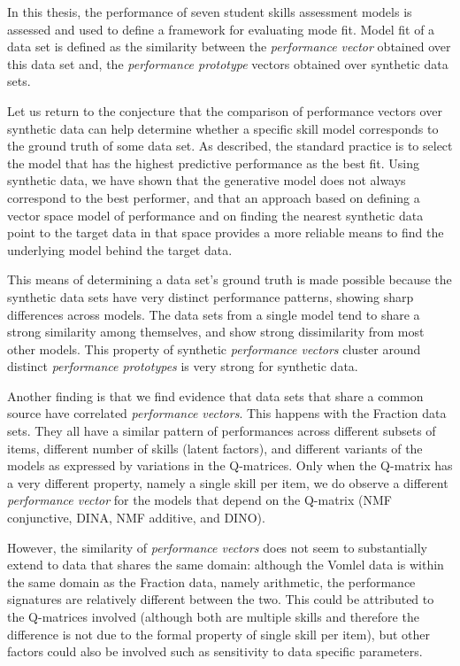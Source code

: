 \label{sec:Conclusion}

In this thesis, the performance of seven student skills assessment models is assessed and used to define a framework for evaluating mode fit. Model fit of a data set is defined as the similarity between the \textit{performance vector} obtained over this data set and, the \textit{performance prototype} vectors obtained over synthetic data sets.

Let us return to the conjecture that the comparison of performance vectors over synthetic data can help determine whether a specific skill model corresponds to the ground truth of some data set. As described, the standard practice is to select the model that has the highest predictive performance as the best fit. Using synthetic data, we have shown that the generative model does not always correspond to the best performer, and that an approach based on defining a vector space model of performance and on finding the nearest synthetic data point to the target data in that space provides a more reliable means to find the underlying model behind the target data.

This means of determining a data set's ground truth is made possible because the synthetic data sets have very distinct performance patterns, showing sharp differences across models. The data sets from a single model tend to share a strong similarity among themselves, and show strong dissimilarity from most other models. This property of synthetic \textit{performance vectors} cluster around distinct \textit{performance prototypes} is very strong for synthetic data.

Another finding is that we find evidence that data sets that share a common source have correlated \textit{performance vectors}. This happens with the Fraction data sets. They all have a similar pattern of performances across different subsets of items, different number of skills (latent factors), and different variants of the models as expressed by variations in the Q-matrices. Only when the Q-matrix has a very different property, namely a single skill per item, we do observe a different \textit{performance vector} for the models that depend on the Q-matrix (NMF conjunctive, DINA, NMF additive, and DINO). 

However, the similarity of \textit{performance vectors} does not seem to substantially extend to data that shares the same domain: although the Vomlel data is within the same domain as the Fraction data, namely arithmetic, the performance signatures are relatively different between the two. This could be attributed to the Q-matrices involved (although both are multiple skills and therefore the difference is not due to the formal property of single skill per item), but other factors could also be involved such as sensitivity to data specific parameters.


